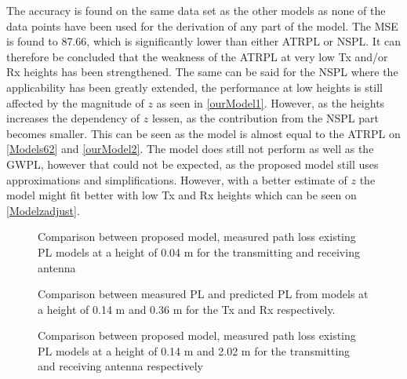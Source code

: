 The accuracy is found on the same data set as the other models as none of the data points have been used for the derivation of any part of the model. The MSE is found to 87.66, which is significantly lower than either ATRPL or NSPL. It can therefore be concluded that the weakness of the ATRPL at very low Tx and/or Rx heights has been strengthened. The same can be said for the NSPL where the applicability has been greatly extended, the performance at low heights is still affected by the magnitude of $z$ as seen in \autoref{ourModel1}. However, as the heights increases the dependency of $z$ lessen, as the contribution from the NSPL part becomes smaller. This can be seen as the model is almost equal to the ATRPL on \autoref{Models62} and \autoref{ourModel2}.  The model does still not perform as well as the GWPL, however that could not be expected, as the proposed model still uses approximations and simplifications. However, with a better estimate of $z$ the model might fit better with low Tx and Rx heights which can be seen on \autoref{Modelzadjust}. 

\begin{figure}[H]
\centering

\caption{Comparison between proposed model, measured path loss existing PL models at a height of 0.04 m for the transmitting and receiving antenna}
\label{ourModel1}
\end{figure}

\begin{figure}[H]
\centering

\caption{Comparison between measured PL and predicted PL from models at a height of 0.14 m and 0.36 m for the Tx and Rx respectively.}
\label{Models62}
\end{figure}

\begin{figure}[H]
\centering

\caption{Comparison between proposed model, measured path loss existing PL models at a height of 0.14 m and 2.02 m for the transmitting and receiving antenna respectively}
\label{ourModel2}
\end{figure}





